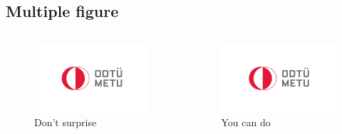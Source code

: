 \documentclass{beamer}
\begin{document}
\subsection{Multiple figure}
\begin{frame}
\begin{columns}[onlytextwidth]
\begin{column}{.45\textwidth}
\begin{figure}
  \includegraphics[width=\textwidth]{logo.jpg}
  \caption{Don't surprise}
\end{figure}
\end{column}
\hfill
\begin{column}{.45\textwidth}
\begin{figure}
  \includegraphics[width=\textwidth]{logo.jpg}
  \caption{You can do}
\end{figure}
\end{column}
\end{columns}
\end{frame}
\end{document}
